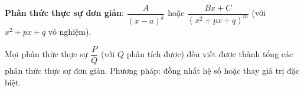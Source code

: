 \documentclass[12pt,a4paper]{article}
\begin{document}
\begin{dinhnghia}
  \textbf{Phân thức thực sự đơn giản}: $\dfrac{A}{(x - a)^k}$ hoặc $\dfrac{Bx + C}{(x^2 + px + q)^m}$ (với $x^2 + px + q$ vô nghiệm).
\end{dinhnghia}

\begin{dinhly}[title={Phân tích thành tổng phân thức đơn giản}]
  Mọi phân thức thực sự $\dfrac{P}{Q}$ (với $Q$ phân tích được) đều viết được thành tổng các phân thức thực sự đơn giản. Phương pháp: đồng nhất hệ số hoặc thay giá trị đặc biệt.
\end{dinhly}
\end{document}
